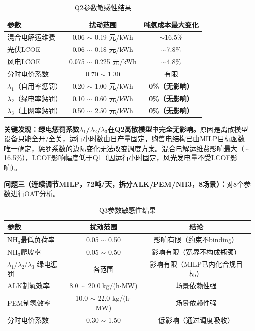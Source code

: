 \documentclass[zihao=-4,a4paper]{ctexart} %
\begin{document}
	\begin{table}[ht]
		\centering
		\small
		\caption{Q2参数敏感性结果}
		\label{tab:q6_q2}
		\begin{tabular}{lcc}
			\toprule
			参数 & 扰动范围 & 吨氨成本最大变化 \\
			\midrule
			混合电解运维费 & 0.06 $\sim$ 0.19 元/kWh & $\sim$16.5\% \\
			光伏LCOE & 0.06 $\sim$ 0.18 元/kWh & $\sim$7.8\% \\
			风电LCOE & 0.075 $\sim$ 0.225 元/kWh & $\sim$4.8\% \\
			分时电价系数 & 0.70 $\sim$ 1.30 & 有限 \\
			$\lambda_1$（自用率惩罚） & 0.20 $\sim$ 1.00 元/kWh & \textbf{0\%（无影响）} \\
			$\lambda_2$（绿电率惩罚） & 0.10 $\sim$ 0.60 元/kWh & \textbf{0\%（无影响）} \\
			$\lambda_3$（上网率惩罚） & 0.50 $\sim$ 2.50 元/kWh & \textbf{0\%（无影响）} \\
			\bottomrule
		\end{tabular}
	\end{table}
	
	\textbf{关键发现：绿电惩罚系数$\lambda_1$/$\lambda_2$/$\lambda_3$在Q2离散模型中完全无影响。}原因是离散模型设备只能全开/全关，运行小时数由日产量固定，购售电结构已由MILP目标函数唯一确定，惩罚系数的边际变化无法改变调度方案。混合电解运维费影响最大（$\sim$16.5\%），LCOE影响幅度低于Q1（因运行小时固定，风光发电量不受LCOE影响）。
	
	\textbf{问题三（连续调节MILP，72吨/天，拆分ALK/PEM/NH3，8场景）：}对8个参数进行OAT分析。
	
	\begin{table}[ht]
		\centering
		\small
		\caption{Q3参数敏感性结果}
		\label{tab:q6_q3}
		\begin{tabular}{lcc}
			\toprule
			参数 & 扰动范围 & 结论 \\
			\midrule
			NH$_3$最低负荷率 & 0.05 $\sim$ 0.50 & 影响有限（约束不binding） \\
			NH$_3$爬坡率 & 0.05 $\sim$ 0.50 & 影响有限（宽界不构成瓶颈） \\
			$\lambda_1$/$\lambda_2$/$\lambda_3$ 绿电惩罚 & 各范围 & 影响有限（MILP已内化合规目标） \\
			ALK制氢效率 & 8.0 $\sim$ 20.0 kg/(h$\cdot$MW) & 场景依赖性强 \\
			PEM制氢效率 & 10.0 $\sim$ 22.0 kg/(h$\cdot$MW) & 场景依赖性强 \\
			分时电价系数 & 0.30 $\sim$ 1.50 & 低影响（通过调度吸收） \\
			\bottomrule
		\end{tabular}
	\end{table}
	
\end{document}
